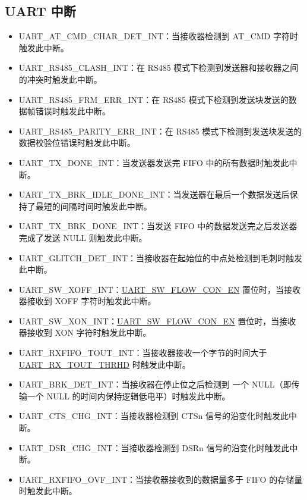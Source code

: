 \documentclass[main\_\_CN.tex]{subfiles}
\begin{document}
\subsection{UART 中断}
\begin{itemize}
\item \label{int:UARTATCMDCHARDETINT}UART\_AT\_CMD\_CHAR\_DET\_INT：当接收器检测到 AT\_CMD 字符时触发此中断。
\item \label{int:UARTRS485CLASHINT}UART\_RS485\_CLASH\_INT：在 RS485 模式下检测到发送器和接收器之间的冲突时触发此中断。
\item \label{int:UARTRS485FRMERRINT}UART\_RS485\_FRM\_ERR\_INT：在 RS485 模式下检测到发送块发送的数据帧错误时触发此中断。
\item \label{int:UARTRS485PARITYERRINT}UART\_RS485\_PARITY\_ERR\_INT：在 RS485 模式下检测到发送块发送的数据校验位错误时触发此中断。
\item \label{int:UARTTXDONEINT}UART\_TX\_DONE\_INT：当发送器发送完 FIFO 中的所有数据时触发此中断。
\item \label{int:UARTTXBRKIDLEDONEINT}UART\_TX\_BRK\_IDLE\_DONE\_INT：当发送器在最后一个数据发送后保持了最短的间隔时间时触发此中断。
\item \label{int:UARTTXBRKDONEINT}UART\_TX\_BRK\_DONE\_INT：当发送 FIFO 中的数据发送完之后发送器完成了发送 NULL 则触发此中断。
\item \label{int:UARTGLITCHDETINT}UART\_GLITCH\_DET\_INT：当接收器在起始位的中点处检测到毛刺时触发此中断。
\item \label{int:UARTSWXOFFINT}UART\_SW\_XOFF\_INT：\hyperref[fielddesc:UARTSWFLOWCONEN]{UART\_SW\_FLOW\_CON\_EN} 置位时，当接收器接收到 XOFF 字符时触发此中断。
\item \label{int:UARTSWXONINT}UART\_SW\_XON\_INT：\hyperref[fielddesc:UARTSWFLOWCONEN]{UART\_SW\_FLOW\_CON\_EN} 置位时，当接收器接收到 XON 字符时触发此中断。
\item \label{int:UARTRXFIFOTOUTINT}UART\_RXFIFO\_TOUT\_INT：当接收器接收一个字节的时间大于 \hyperref[fielddesc:UARTRXTOUTTHRHD]{UART\_RX\_TOUT\_THRHD} 时触发此中断。
\item \label{int:UARTBRKDETINT}UART\_BRK\_DET\_INT：当接收器在停止位之后检测到 一个 NULL（即传输一个 NULL 的时间内保持逻辑低电平）时触发此中断。
\item \label{int:UARTCTSCHGINT}UART\_CTS\_CHG\_INT：当接收器检测到 CTSn 信号的沿变化时触发此中断。
\item \label{int:UARTDSRCHGINT}UART\_DSR\_CHG\_INT：当接收器检测到 DSRn 信号的沿变化时触发此中断。
\item \label{int:UARTRXFIFOOVFINT}UART\_RXFIFO\_OVF\_INT：当接收器接收到的数据量多于 FIFO 的存储量时触发此中断。

\end{itemize}
\end{document}
